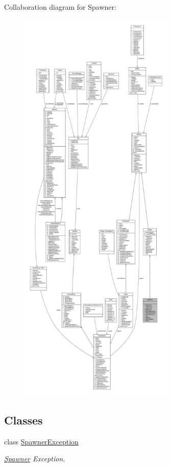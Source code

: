 Collaboration diagram for Spawner\+:
\nopagebreak
\begin{figure}[H]
\begin{center}
\leavevmode
\includegraphics[height=550pt]{class_spawner__coll__graph}
\end{center}
\end{figure}
\subsection*{Classes}
\begin{DoxyCompactItemize}
\item 
class \hyperlink{class_spawner_1_1_spawner_exception}{Spawner\+Exception}
\begin{DoxyCompactList}\small\item\em \hyperlink{class_spawner}{Spawner} Exception. \end{DoxyCompactList}\end{DoxyCompactItemize}
